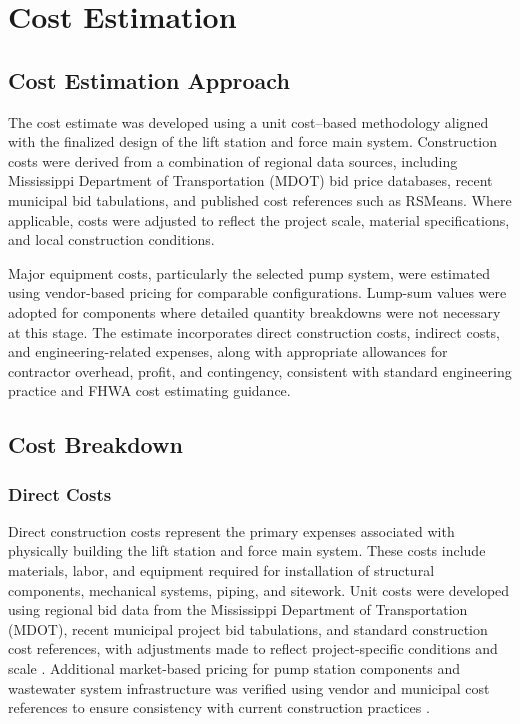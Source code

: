 
\chapter{Cost Estimation}

\section{Cost Estimation Approach}

The cost estimate was developed using a unit cost–based methodology aligned with the finalized design of the lift station and force main system. Construction costs were derived from a combination of regional data sources, including Mississippi Department of Transportation (MDOT) bid price databases, recent municipal bid tabulations, and published cost references such as RSMeans. Where applicable, costs were adjusted to reflect the project scale, material specifications, and local construction conditions.

Major equipment costs, particularly the selected pump system, were estimated using vendor-based pricing for comparable configurations. Lump-sum values were adopted for components where detailed quantity breakdowns were not necessary at this stage. The estimate incorporates direct construction costs, indirect costs, and engineering-related expenses, along with appropriate allowances for contractor overhead, profit, and contingency, consistent with standard engineering practice and FHWA cost estimating guidance.

\section{Cost Breakdown}

\subsection{Direct Costs}

Direct construction costs represent the primary expenses associated with physically building the lift station and force main system. These costs include materials, labor, and equipment required for installation of structural components, mechanical systems, piping, and sitework. Unit costs were developed using regional bid data from the Mississippi Department of Transportation (MDOT), recent municipal project bid tabulations, and standard construction cost references, with adjustments made to reflect project-specific conditions and scale \cite{MDOT_BidTab_2024, CityMagnolia_BidTab_2024, CityClinton_BidTab_2020, RSMeans_CostData_2025}. Additional market-based pricing for pump station components and wastewater system infrastructure was verified using vendor and municipal cost references to ensure consistency with current construction practices \cite{ExcelFluidGroup_PumpComparison_2024, WaterLevelControls_LiftStationCosts_2024, Wildwood_UtilityCostSchedule_2022}.

